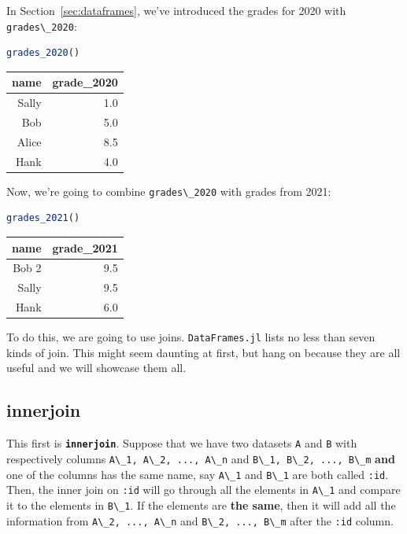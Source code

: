 \documentclass[
  notoc %
]{tufte-book}
\newcommand{\passthrough}[1]{#1}
\begin{document}
In Section~\ref{sec:dataframes}, we've introduced the grades for 2020
with \passthrough{\lstinline!grades\_2020!}:

\begin{lstlisting}[language=Julia]
grades_2020()
\end{lstlisting}

\begin{longtable}[]{@{}rr@{}}
\toprule()
name & grade\_2020 \\
\midrule()
\endhead
Sally & 1.0 \\
Bob & 5.0 \\
Alice & 8.5 \\
Hank & 4.0 \\
\bottomrule()
\end{longtable}

Now, we're going to combine \passthrough{\lstinline!grades\_2020!} with
grades from 2021:

\begin{lstlisting}[language=Julia]
grades_2021()
\end{lstlisting}

\begin{longtable}[]{@{}rr@{}}
\toprule()
name & grade\_2021 \\
\midrule()
\endhead
Bob 2 & 9.5 \\
Sally & 9.5 \\
Hank & 6.0 \\
\bottomrule()
\end{longtable}

To do this, we are going to use joins.
\passthrough{\lstinline!DataFrames.jl!} lists no less than seven kinds
of join. This might seem daunting at first, but hang on because they are
all useful and we will showcase them all.

\hypertarget{sec:innerjoin}{%
\subsection{innerjoin}\label{sec:innerjoin}}

This first is \textbf{\passthrough{\lstinline!innerjoin!}}. Suppose that
we have two datasets \passthrough{\lstinline!A!} and
\passthrough{\lstinline!B!} with respectively columns
\passthrough{\lstinline!A\_1, A\_2, ..., A\_n!} and
\passthrough{\lstinline!B\_1, B\_2, ..., B\_m!} \textbf{and} one of the
columns has the same name, say \passthrough{\lstinline!A\_1!} and
\passthrough{\lstinline!B\_1!} are both called
\passthrough{\lstinline!:id!}. Then, the inner join on
\passthrough{\lstinline!:id!} will go through all the elements in
\passthrough{\lstinline!A\_1!} and compare it to the elements in
\passthrough{\lstinline!B\_1!}. If the elements are \textbf{the same},
then it will add all the information from
\passthrough{\lstinline!A\_2, ..., A\_n!} and
\passthrough{\lstinline!B\_2, ..., B\_m!} after the
\passthrough{\lstinline!:id!} column.
\end{document}
